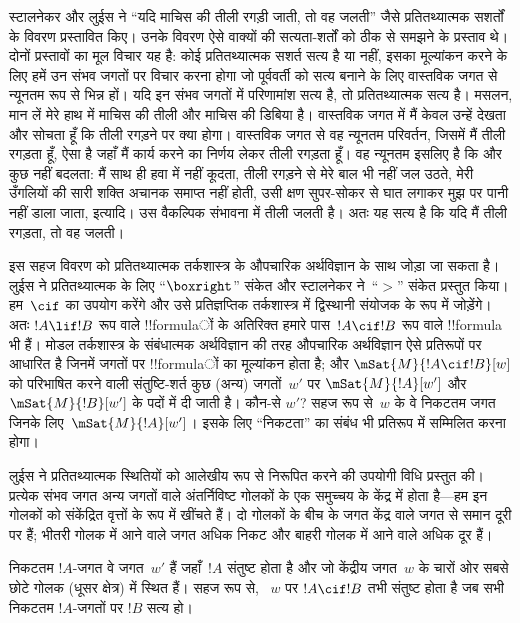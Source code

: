 \documentclass[../../../include/open-logic-section]{subfiles}
\begin{document}


स्टालनेकर और लुईस ने ``यदि माचिस की तीली रगड़ी जाती, तो वह जलती'' जैसे
प्रतितथ्यात्मक सशर्तों के विवरण प्रस्तावित किए। उनके विवरण ऐसे वाक्यों की
सत्यता-शर्तों को ठीक से समझने के प्रस्ताव थे। दोनों प्रस्तावों का मूल विचार
यह है: कोई प्रतितथ्यात्मक सशर्त सत्य है या नहीं, इसका मूल्यांकन करने के लिए
हमें उन संभव जगतों पर विचार करना होगा जो पूर्ववर्ती को सत्य बनाने के लिए
वास्तविक जगत से न्यूनतम रूप से भिन्न हों। यदि इन संभव जगतों में परिणामांश
सत्य है, तो प्रतितथ्यात्मक सत्य है। मसलन, मान लें मेरे हाथ में माचिस की तीली
और माचिस की डिबिया है। वास्तविक जगत में मैं केवल उन्हें देखता और सोचता हूँ
कि तीली रगड़ने पर क्या होगा। वास्तविक जगत से वह न्यूनतम परिवर्तन, जिसमें
मैं तीली रगड़ता हूँ, ऐसा है जहाँ मैं कार्य करने का निर्णय लेकर तीली रगड़ता
हूँ। वह न्यूनतम इसलिए है कि और कुछ नहीं बदलता: मैं साथ ही हवा में नहीं
कूदता, तीली रगड़ने से मेरे बाल भी नहीं जल उठते, मेरी उँगलियों की सारी शक्ति
अचानक समाप्त नहीं होती, उसी क्षण सुपर-सोकर से घात लगाकर मुझ पर पानी नहीं
डाला जाता, इत्यादि। उस वैकल्पिक संभावना में तीली जलती है। अतः यह सत्य है
कि यदि मैं तीली रगड़ता, तो वह जलती।

इस सहज विवरण को प्रतितथ्यात्मक तर्कशास्त्र के औपचारिक अर्थविज्ञान के साथ
जोड़ा जा सकता है। लुईस ने प्रतितथ्यात्मक के लिए ``$\boxright$'' संकेत और
स्टालनेकर ने~``$>$'' संकेत प्रस्तुत किया। हम~$\cif$ का उपयोग करेंगे और उसे
प्रतिज्ञप्तिक तर्कशास्त्र में द्विस्थानी संयोजक के रूप में जोड़ेंगे। अतः
$!A \lif !B$ रूप वाले !!{formula}ों के अतिरिक्त हमारे पास~$!A \cif !B$ रूप
वाले !!{formula} भी हैं। मोडल तर्कशास्त्र के संबंधात्मक अर्थविज्ञान की तरह
औपचारिक अर्थविज्ञान ऐसे प्रतिरूपों पर आधारित है जिनमें जगतों पर !!{formula}ों
का मूल्यांकन होता है; और $\mSat{M}{!A \cif !B}[w]$ को परिभाषित करने वाली
संतुष्टि-शर्त कुछ (अन्य) जगतों~$w'$ पर $\mSat{M}{!A}[w']$ और
$\mSat{M}{!B}[w']$ के पदों में दी जाती है। कौन-से $w'$? सहज रूप से~$w$ के
वे निकटतम जगत जिनके लिए~$\mSat{M}{!A}[w']$। इसके लिए ``निकटता'' का संबंध भी
प्रतिरूप में सम्मिलित करना होगा।

लुईस ने प्रतितथ्यात्मक स्थितियों को आलेखीय रूप से निरूपित करने की उपयोगी
विधि प्रस्तुत की। प्रत्येक संभव जगत अन्य जगतों वाले अंतर्निविष्ट गोलकों के
एक समुच्चय के केंद्र में होता है---हम इन गोलकों को संकेंद्रित वृत्तों के रूप
में खींचते हैं। दो गोलकों के बीच के जगत केंद्र वाले जगत से समान दूरी पर हैं;
भीतरी गोलक में आने वाले जगत अधिक निकट और बाहरी गोलक में आने वाले अधिक दूर
हैं।
\begin{center}
\end{center}
निकटतम $!A$-जगत वे जगत~$w'$ हैं जहाँ~$!A$ संतुष्ट होता है और जो केंद्रीय
जगत~$w$ के चारों ओर सबसे छोटे गोलक (धूसर क्षेत्र) में स्थित हैं। सहज रूप से,
~$w$ पर $!A \cif !B$ तभी संतुष्ट होता है जब सभी निकटतम $!A$-जगतों पर $!B$
सत्य हो।
\end{document}
